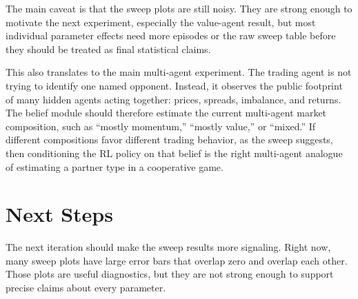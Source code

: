 \documentclass[11pt]{article}
\begin{document}
The main caveat is that the sweep plots are still noisy. They are strong enough
to motivate the next experiment, especially the value-agent result, but most
individual parameter effects need more episodes or the raw sweep table before
they should be treated as final statistical claims.

This also translates to the main multi-agent experiment. The trading agent is
not trying to identify one named opponent. Instead, it observes the public
footprint of many hidden agents acting together: prices, spreads, imbalance,
and returns. The belief module should therefore estimate the current
multi-agent market composition, such as ``mostly momentum,'' ``mostly value,''
or ``mixed.'' If different compositions favor different trading behavior, as
the sweep suggests, then conditioning the RL policy on that belief is the right
multi-agent analogue of estimating a partner type in a cooperative game.

\section{Next Steps}

The next iteration should make the sweep results more signaling. Right now,
many sweep plots have large error bars that overlap zero and overlap each other.
Those plots are useful diagnostics, but they are not strong enough to support
precise claims about every parameter.
\end{document}
